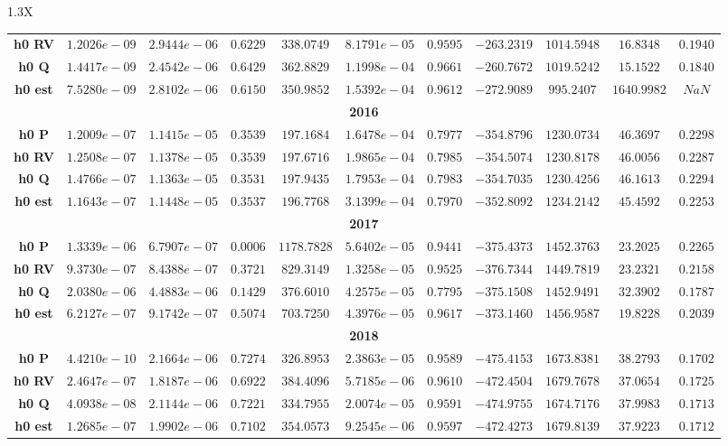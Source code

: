 \documentclass[10pt]{article}
\begin{document}
{\begin{tabularx}{1.3\textwidth}{X}
{\begin{tabular}{ccccccccccc}
 { {\bf h0 RV}}& $1.2026e-09$ & $2.9444e-06$ & $0.6229$ & $338.0749$ & $8.1791e-05$ & $0.9595$ & $-263.2319$& $1014.5948$& $16.8348$ &$0.1940$\\
 { {\bf h0 Q}}& $1.4417e-09$ & $2.4542e-06$ & $0.6429$ & $362.8829$ & $1.1998e-04$ & $0.9661$ & $-260.7672$& $1019.5242$& $15.1522$ &$0.1840$\\
 { {\bf h0 est}}& $7.5280e-09$ & $2.8102e-06$ & $0.6150$ & $350.9852$ & $1.5392e-04$ & $0.9612$ & $-272.9089$& $995.2407$& $1640.9982$ &$NaN$\\
\bottomrule
\multicolumn{11}{c}{{\bf2016}} \\
\cmidrule(r){1-11} 
 { {\bf h0 P}}& $1.2009e-07$ & $1.1415e-05$ & $0.3539$ & $197.1684$ & $1.6478e-04$ & $0.7977$ & $-354.8796$& $1230.0734$& $46.3697$ &$0.2298$\\
 { {\bf h0 RV}}& $1.2508e-07$ & $1.1378e-05$ & $0.3539$ & $197.6716$ & $1.9865e-04$ & $0.7985$ & $-354.5074$& $1230.8178$& $46.0056$ &$0.2287$\\
 { {\bf h0 Q}}& $1.4766e-07$ & $1.1363e-05$ & $0.3531$ & $197.9435$ & $1.7953e-04$ & $0.7983$ & $-354.7035$& $1230.4256$& $46.1613$ &$0.2294$\\
 { {\bf h0 est}}& $1.1643e-07$ & $1.1448e-05$ & $0.3537$ & $196.7768$ & $3.1399e-04$ & $0.7970$ & $-352.8092$& $1234.2142$& $45.4592$ &$0.2253$\\
\bottomrule
\multicolumn{11}{c}{{\bf2017}} \\
\cmidrule(r){1-11} 
 { {\bf h0 P}}& $1.3339e-06$ & $6.7907e-07$ & $0.0006$ & $1178.7828$ & $5.6402e-05$ & $0.9441$ & $-375.4373$& $1452.3763$& $23.2025$ &$0.2265$\\
 { {\bf h0 RV}}& $9.3730e-07$ & $8.4388e-07$ & $0.3721$ & $829.3149$ & $1.3258e-05$ & $0.9525$ & $-376.7344$& $1449.7819$& $23.2321$ &$0.2158$\\
 { {\bf h0 Q}}& $2.0380e-06$ & $4.4883e-06$ & $0.1429$ & $376.6010$ & $4.2575e-05$ & $0.7795$ & $-375.1508$& $1452.9491$& $32.3902$ &$0.1787$\\
 { {\bf h0 est}}& $6.2127e-07$ & $9.1742e-07$ & $0.5074$ & $703.7250$ & $4.3976e-05$ & $0.9617$ & $-373.1460$& $1456.9587$& $19.8228$ &$0.2039$\\
\bottomrule
\multicolumn{11}{c}{{\bf2018}} \\
\cmidrule(r){1-11} 
 { {\bf h0 P}}& $4.4210e-10$ & $2.1664e-06$ & $0.7274$ & $326.8953$ & $2.3863e-05$ & $0.9589$ & $-475.4153$& $1673.8381$& $38.2793$ &$0.1702$\\
 { {\bf h0 RV}}& $2.4647e-07$ & $1.8187e-06$ & $0.6922$ & $384.4096$ & $5.7185e-06$ & $0.9610$ & $-472.4504$& $1679.7678$& $37.0654$ &$0.1725$\\
 { {\bf h0 Q}}& $4.0938e-08$ & $2.1144e-06$ & $0.7221$ & $334.7955$ & $2.0074e-05$ & $0.9591$ & $-474.9755$& $1674.7176$& $37.9983$ &$0.1713$\\
 { {\bf h0 est}}& $1.2685e-07$ & $1.9902e-06$ & $0.7102$ & $354.0573$ & $9.2545e-06$ & $0.9597$ & $-472.4273$& $1679.8139$& $37.9223$ &$0.1712$\\
\bottomrule
\end{tabular}}
\end{tabularx}}

  \vspace{3 cm}

  
\end{document}
